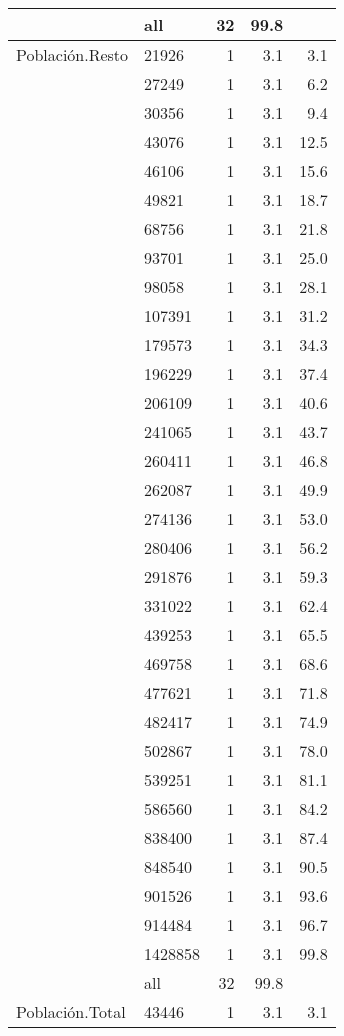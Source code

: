 \documentclass{article}
\begin{document}
\begin{longtable}{llrrr}
   \hline
 & all & 32 & 99.8 &  \\ 
   \hline
\hline
Población.Resto & 21926 & 1 & 3.1 & 3.1 \\ 
   & 27249 & 1 & 3.1 & 6.2 \\ 
   & 30356 & 1 & 3.1 & 9.4 \\ 
   & 43076 & 1 & 3.1 & 12.5 \\ 
   & 46106 & 1 & 3.1 & 15.6 \\ 
   & 49821 & 1 & 3.1 & 18.7 \\ 
   & 68756 & 1 & 3.1 & 21.8 \\ 
   & 93701 & 1 & 3.1 & 25.0 \\ 
   & 98058 & 1 & 3.1 & 28.1 \\ 
   & 107391 & 1 & 3.1 & 31.2 \\ 
   & 179573 & 1 & 3.1 & 34.3 \\ 
   & 196229 & 1 & 3.1 & 37.4 \\ 
   & 206109 & 1 & 3.1 & 40.6 \\ 
   & 241065 & 1 & 3.1 & 43.7 \\ 
   & 260411 & 1 & 3.1 & 46.8 \\ 
   & 262087 & 1 & 3.1 & 49.9 \\ 
   & 274136 & 1 & 3.1 & 53.0 \\ 
   & 280406 & 1 & 3.1 & 56.2 \\ 
   & 291876 & 1 & 3.1 & 59.3 \\ 
   & 331022 & 1 & 3.1 & 62.4 \\ 
   & 439253 & 1 & 3.1 & 65.5 \\ 
   & 469758 & 1 & 3.1 & 68.6 \\ 
   & 477621 & 1 & 3.1 & 71.8 \\ 
   & 482417 & 1 & 3.1 & 74.9 \\ 
   & 502867 & 1 & 3.1 & 78.0 \\ 
   & 539251 & 1 & 3.1 & 81.1 \\ 
   & 586560 & 1 & 3.1 & 84.2 \\ 
   & 838400 & 1 & 3.1 & 87.4 \\ 
   & 848540 & 1 & 3.1 & 90.5 \\ 
   & 901526 & 1 & 3.1 & 93.6 \\ 
   & 914484 & 1 & 3.1 & 96.7 \\ 
   & 1428858 & 1 & 3.1 & 99.8 \\ 
   \hline
 & all & 32 & 99.8 &  \\ 
   \hline
\hline
Población.Total & 43446 & 1 & 3.1 & 3.1 \\ 

\end{longtable}
\end{document}
